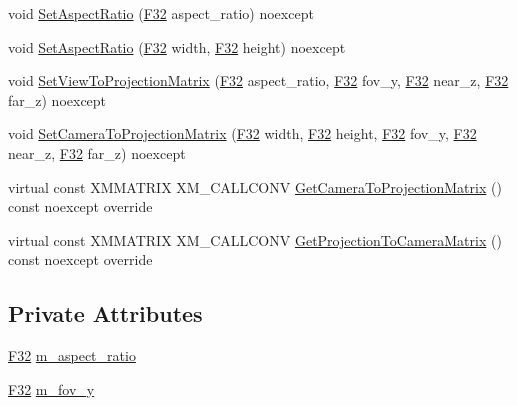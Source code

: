 \begin{DoxyCompactItemize}
\item 
void \hyperlink{classmage_1_1rendering_1_1_perspective_camera_a180f74e8b39609aee8dcc2741a74076f}{Set\+Aspect\+Ratio} (\hyperlink{namespacemage_aa97e833b45f06d60a0a9c4fc22ae02c0}{F32} aspect\+\_\+ratio) noexcept
\item 
void \hyperlink{classmage_1_1rendering_1_1_perspective_camera_a09a93f5281723ec6ccf1adf636619e60}{Set\+Aspect\+Ratio} (\hyperlink{namespacemage_aa97e833b45f06d60a0a9c4fc22ae02c0}{F32} width, \hyperlink{namespacemage_aa97e833b45f06d60a0a9c4fc22ae02c0}{F32} height) noexcept
\item 
void \hyperlink{classmage_1_1rendering_1_1_perspective_camera_a3eff3d0cf0cbdba0682e0932cdb17886}{Set\+View\+To\+Projection\+Matrix} (\hyperlink{namespacemage_aa97e833b45f06d60a0a9c4fc22ae02c0}{F32} aspect\+\_\+ratio, \hyperlink{namespacemage_aa97e833b45f06d60a0a9c4fc22ae02c0}{F32} fov\+\_\+y, \hyperlink{namespacemage_aa97e833b45f06d60a0a9c4fc22ae02c0}{F32} near\+\_\+z, \hyperlink{namespacemage_aa97e833b45f06d60a0a9c4fc22ae02c0}{F32} far\+\_\+z) noexcept
\item 
void \hyperlink{classmage_1_1rendering_1_1_perspective_camera_a917ffbdee3cd5095568d69d3209912f0}{Set\+Camera\+To\+Projection\+Matrix} (\hyperlink{namespacemage_aa97e833b45f06d60a0a9c4fc22ae02c0}{F32} width, \hyperlink{namespacemage_aa97e833b45f06d60a0a9c4fc22ae02c0}{F32} height, \hyperlink{namespacemage_aa97e833b45f06d60a0a9c4fc22ae02c0}{F32} fov\+\_\+y, \hyperlink{namespacemage_aa97e833b45f06d60a0a9c4fc22ae02c0}{F32} near\+\_\+z, \hyperlink{namespacemage_aa97e833b45f06d60a0a9c4fc22ae02c0}{F32} far\+\_\+z) noexcept
\item 
virtual const X\+M\+M\+A\+T\+R\+IX X\+M\+\_\+\+C\+A\+L\+L\+C\+O\+NV \hyperlink{classmage_1_1rendering_1_1_perspective_camera_af0892905a0030fc70bdc629007cde5a0}{Get\+Camera\+To\+Projection\+Matrix} () const noexcept override
\item 
virtual const X\+M\+M\+A\+T\+R\+IX X\+M\+\_\+\+C\+A\+L\+L\+C\+O\+NV \hyperlink{classmage_1_1rendering_1_1_perspective_camera_af049c6330ebdaa822bfd31dc88f25ac2}{Get\+Projection\+To\+Camera\+Matrix} () const noexcept override
\end{DoxyCompactItemize}
\subsection*{Private Attributes}
\begin{DoxyCompactItemize}
\item 
\hyperlink{namespacemage_aa97e833b45f06d60a0a9c4fc22ae02c0}{F32} \hyperlink{classmage_1_1rendering_1_1_perspective_camera_a28abd925a9694954dcd26a4c16b6ac6d}{m\+\_\+aspect\+\_\+ratio}
\item 
\hyperlink{namespacemage_aa97e833b45f06d60a0a9c4fc22ae02c0}{F32} \hyperlink{classmage_1_1rendering_1_1_perspective_camera_afa70744921fce139d518730f998bd566}{m\+\_\+fov\+\_\+y}
\end{DoxyCompactItemize}
